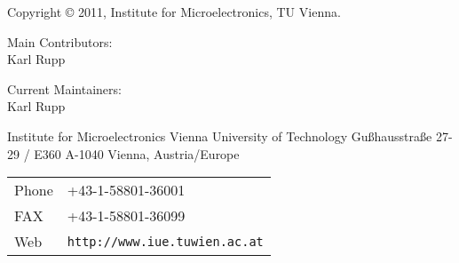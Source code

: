 
\clearpage

Copyright {\copyright} 2011, Institute for Microelectronics, TU Vienna.

\vspace{3.5cm}

Main Contributors:\\ 

Karl Rupp\\

\vspace{3.5cm}

Current Maintainers: \\

Karl Rupp\\


\vspace{7.0cm}

Institute for Microelectronics\newline
Vienna University of Technology\newline
Gu\ss hausstra\ss e 27-29 / E360\newline
A-1040 Vienna, Austria/Europe\newline


\begin{tabular}{ll}
Phone  & +43-1-58801-36001\\
FAX    & +43-1-58801-36099\\
Web    & \texttt{http://www.iue.tuwien.ac.at}
\end{tabular}



